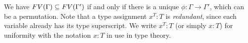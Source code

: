 \begin{definition}
\begin{enumerate}
%
%

\end{enumerate}
\end{definition}

We have ${{\relax FV}}(\Gamma) \subseteq {{\relax FV}}(\Gamma')$ if and only if 
there is a unique $\phi:\Gamma \rightarrow \Gamma'$, which can be a permutation. 
Note that a type assignment $x^T:T$ is \emph{redundant},
since each variable already has its type superscript.
We write $x^T:T$ (or simply $x:T$)
for uniformity with the notation $x:T$ in use in type theory.







